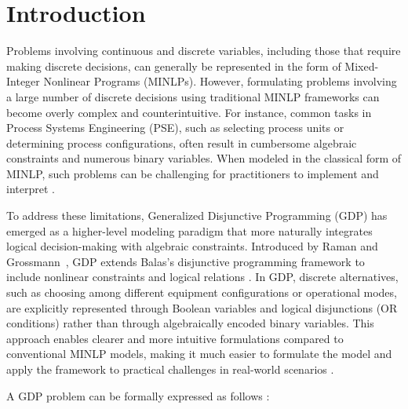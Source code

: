 \documentclass[11pt]{article}
\begin{document}
\section{Introduction}

Problems involving continuous and discrete variables, including those that require making discrete decisions, can generally be represented in the form of Mixed-Integer Nonlinear Programs (MINLPs).
However, formulating problems involving a large number of discrete decisions using traditional MINLP frameworks can become overly complex and counterintuitive.
For instance, common tasks in Process Systems Engineering (PSE), such as selecting process units or determining process configurations, often result in cumbersome algebraic constraints and numerous binary variables.
When modeled in the classical form of MINLP, such problems can be challenging for practitioners to implement and interpret \cite{mencarelliReviewSuperstructureOptimization2020, grossmannSystematicModelingDiscretecontinuous2013, kronqvist50YearsMixedinteger2025}.


To address these limitations, Generalized Disjunctive Programming (GDP) has emerged as a higher-level modeling paradigm that more naturally integrates logical decision-making with algebraic constraints.
Introduced by Raman and Grossmann~\cite{ramanModellingComputationalTechniques1994}, GDP extends Balas's disjunctive programming framework \cite{balasDisjunctiveProgramming2018} to include nonlinear constraints and logical relations \cite{chenModernModelingParadigms2019, mencarelliReviewSuperstructureOptimization2020, grossmannSystematicModelingDiscretecontinuous2013}.
In GDP, discrete alternatives, such as choosing among different equipment configurations or operational modes, are explicitly represented through Boolean variables and logical disjunctions (OR conditions) rather than through algebraically encoded binary variables.
This approach enables clearer and more intuitive formulations compared to conventional MINLP models, making it much easier to formulate the model and apply the framework to practical challenges in real-world scenarios \cite{grossmannGeneralizedDisjunctiveProgramming2012}.


A GDP problem can be formally expressed as follows \cite{ramanModellingComputationalTechniques1994,chenModernModelingParadigms2019}:
\end{document}
